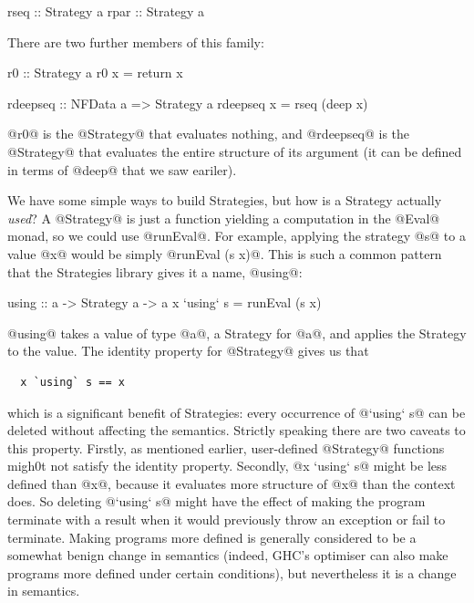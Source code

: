 \begin{haskell}
rseq :: Strategy a
rpar :: Strategy a
\end{haskell}

\noindent There are two further members of this family:

\begin{haskell}
r0 :: Strategy a
r0 x = return x

rdeepseq :: NFData a => Strategy a
rdeepseq x = rseq (deep x)
\end{haskell}

\noindent @r0@ is the @Strategy@ that evaluates nothing, and
@rdeepseq@ is the @Strategy@ that evaluates the entire structure of
its argument (it can be defined in terms of @deep@ that we saw
eariler).

We have some simple ways to build Strategies, but how is a Strategy
actually \emph{used}?  A @Strategy@ is just a function yielding a
computation in the @Eval@ monad, so we could use @runEval@.  For
example, applying the strategy @s@ to a value @x@ would be simply
@runEval (s x)@.  This is such a common pattern that the
Strategies library gives it a name, @using@:

\begin{haskell}
using :: a -> Strategy a -> a
x `using` s = runEval (s x)
\end{haskell}

\noindent @using@ takes a value of type @a@, a Strategy for @a@, and
applies the Strategy to the value.  The identity property for
@Strategy@ gives us that

{\small \begin{verbatim}
  x `using` s == x
\end{verbatim}}

\noindent which is a significant benefit of Strategies: every
occurrence of @`using` s@ can be deleted without affecting the
semantics.  Strictly speaking there are two caveats to this property.
Firstly, as mentioned earlier, user-defined @Strategy@ functions migh0t
not satisfy the identity property.  Secondly, @x `using` s@ might be
less defined than @x@, because it evaluates more structure of @x@ than
the context does.  So deleting @`using` s@ might have the effect of
making the program terminate with a result when it would previously
throw an exception or fail to terminate.  Making programs more defined
is generally considered to be a somewhat benign change in semantics
(indeed, GHC's optimiser can also make programs more defined under
certain conditions), but nevertheless it is a change in semantics.

